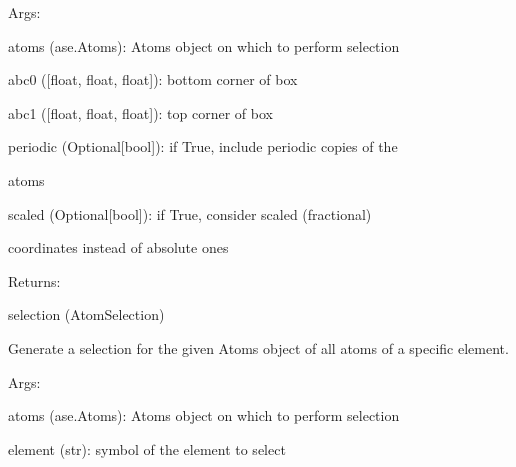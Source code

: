 \documentclass[letterpaper,10pt,english]{sphinxmanual}
\begin{document}
\begin{fulllineitems}
\begin{fulllineitems}
\begin{DUlineblock}{0em}
\item[] Args:
\item[]
\begin{DUlineblock}{\DUlineblockindent}
\item[] atoms (ase.Atoms): Atoms object on which to perform selection
\item[] abc0 ({[}float, float, float{]}): bottom corner of box
\item[] abc1 ({[}float, float, float{]}): top corner of box
\item[] periodic (Optional{[}bool{]}): if True, include periodic copies of the
\item[]
\begin{DUlineblock}{\DUlineblockindent}
\item[] atoms
\end{DUlineblock}
\item[] scaled (Optional{[}bool{]}): if True, consider scaled (fractional)
\item[]
\begin{DUlineblock}{\DUlineblockindent}
\item[] coordinates instead of absolute ones
\end{DUlineblock}
\end{DUlineblock}
\end{DUlineblock}

\begin{DUlineblock}{0em}
\item[] Returns:
\item[]
\begin{DUlineblock}{\DUlineblockindent}
\item[] selection (AtomSelection)
\end{DUlineblock}
\end{DUlineblock}

\end{fulllineitems}


\begin{fulllineitems}
\label{doctree/soprano.selection:soprano.selection.AtomSelection.from_element}
Generate a selection for the given Atoms object of all atoms of a
specific element.

\begin{DUlineblock}{0em}
\item[] Args:
\item[]
\begin{DUlineblock}{\DUlineblockindent}
\item[] atoms (ase.Atoms): Atoms object on which to perform selection
\item[] element (str): symbol of the element to select
\end{DUlineblock}
\end{DUlineblock}


\end{fulllineitems}
\end{fulllineitems}
\end{document}

